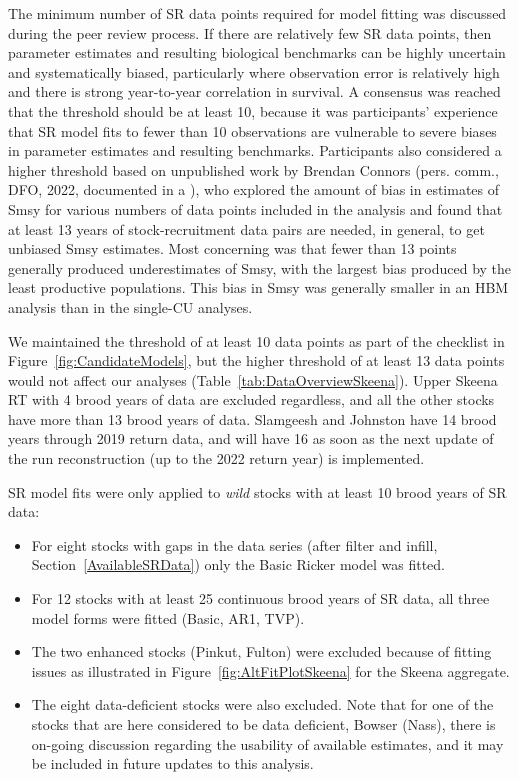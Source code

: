 \documentclass[french,11pt]{book}
\begin{document}
The minimum number of SR data points required for model fitting was discussed during the peer review process. If there are relatively few SR data points, then parameter estimates and resulting biological benchmarks can be highly uncertain and systematically biased, particularly where observation error is relatively high and there is strong year-to-year correlation in survival. A consensus was reached that the threshold should be at least 10, because it was participants' experience that SR model fits to fewer than 10 observations are vulnerable to severe biases in parameter estimates and resulting benchmarks. Participants also considered a higher threshold based on unpublished work by Brendan Connors (pers. comm., DFO, 2022, documented in a ), who explored the amount of bias in estimates of Smsy for various numbers of data points included in the analysis and found that at least 13 years of stock-recruitment data pairs are needed, in general, to get unbiased Smsy estimates. Most concerning was that fewer than 13 points generally produced underestimates of Smsy, with the largest bias produced by the least productive populations. This bias in Smsy was generally smaller in an HBM analysis than in the single-CU analyses.

We maintained the threshold of at least 10 data points as part of the checklist in Figure~\ref{fig:CandidateModels}, but the higher threshold of at least 13 data points would not affect our analyses (Table~\ref{tab:DataOverviewSkeena}). Upper Skeena RT with 4 brood years of data are excluded regardless, and all the other stocks have more than 13 brood years of data. Slamgeesh and Johnston have 14 brood years through 2019 return data, and will have 16 as soon as the next update of the run reconstruction (up to the 2022 return year) is implemented.

SR model fits were only applied to \emph{wild} stocks with at least 10 brood years of SR data:
\begin{itemize}

\item
  For eight stocks with gaps in the data series (after filter and infill, Section~\ref{AvailableSRData}) only the Basic Ricker model was fitted.
\item
  For 12 stocks with at least 25 continuous brood years of SR data, all three model forms were fitted (Basic, AR1, TVP).
\item
  The two enhanced stocks (Pinkut, Fulton) were excluded because of fitting issues as illustrated in Figure~\ref{fig:AltFitPlotSkeena} for the Skeena aggregate.
\item
  The eight data-deficient stocks were also excluded. Note that for one of the stocks that are here considered to be data deficient, Bowser (Nass), there is on-going discussion regarding the usability of available estimates, and it may be included in future updates to this analysis.
\end{itemize}
\clearpage
\end{document}
